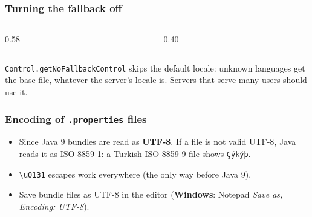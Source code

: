 \documentclass[aspectratio=169,10pt,compress]{beamer}
\newcommand{\win}{\textbf{Windows}}
\begin{document}
\begin{frame}[t,fragile] \frametitle{Turning the fallback off}
  \begin{columns}[T]
    \begin{column}{0.58\textwidth}
    \end{column}
    \begin{column}{0.40\textwidth}
    \end{column}
  \end{columns}

  \vspace{0.1em}
  \small \texttt{Control.getNoFallbackControl} skips the default locale: unknown languages get the base file,
  whatever the server's locale is. Servers that serve many users should use it.
\end{frame}





\begin{frame}[t,fragile] \frametitle{Encoding of \texttt{.properties} files}
  \vspace{0.1em}
  \begin{itemize}\small
    \item Since Java 9 bundles are read as \textbf{UTF-8}. If a file is not valid UTF-8, Java reads it as
      ISO-8859-1: a Turkish ISO-8859-9 file shows \texttt{Çýkýþ}.
    \item \texttt{\textbackslash u0131} escapes work everywhere (the only way before Java 9).
    \item Save bundle files as UTF-8 in the editor (\win: Notepad \emph{Save as, Encoding: UTF-8}).
  \end{itemize}
\end{frame}

\end{document}
